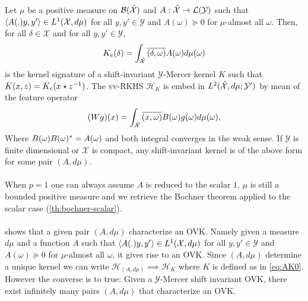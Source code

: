 \begin{proposition}\label{pr:mercer_kernel_bochner}
Let $\mu$ be a positive measure on $\mathcal{B}(\mathcal{\hat{\mathcal{X}}})$ and $A: \hat{\mathcal{X}}\to \mathcal{L}(\mathcal{Y})$ such that $\langle A(.)y,y'\rangle\in L^1(\mathcal{X},d\mu)$ for all $y,y'\in\mathcal{Y}$ and $A(\omega)\succcurlyeq 0$ for $\mu$-almost all $\omega$. Then, for all $\delta \in \mathcal{X}$ and for all $y, y' \in \mathcal{Y}$,
\begin{dmath}
\label{eq:AK0}
K_e(\delta)=\int_{\dual{\mathcal{X}}}\conj{\pairing{\delta,\omega}}A(\omega)d\mu(\omega)
\end{dmath}
is the kernel signature of a shift-invariant $\mathcal{Y}$-Mercer kernel $K$ such that $K(x,z)=K_e(x \star {z}^{-1})$. The \acs{vv-RKHS} $\mathcal{H}_K$ is embed in $L^2(\hat{\mathcal{X}},d\mu;\mathcal{Y}')$ by mean of the feature operator
\begin{dmath}
\label{eq:feature_operator}
(Wg)(x)=\int_{\mathcal{\dual{X}}}\conj{\pairing{x,\omega}}B(\omega)g(\omega)d\mu(\omega),
\end{dmath}
Where $B(\omega)B(\omega)^*=A(\omega)$ and both integral converges in the weak sense. If $\mathcal{Y}$ is finite dimensional or $\mathcal{X}$ is compact, any shift-invariant kernel is of the above form for some pair $(A, d\mu)$. 
\end{proposition}
\paragraph{}
When $p=1$ one can always assume $A$ is reduced to the scalar $1$, $\mu$ is still a bounded positive measure and we retrieve the Bochner theorem applied to the scalar case (\cref{th:bochner-scalar}).
\paragraph{}
 shows that a given pair $(A,d\mu)$ characterize an \acs{OVK}. Namely given a measure $d\mu$ and a function $A$ such that $\langle A(.)y,y'\rangle\in L^1(\mathcal{X},d\mu)$ for all $y,y'\in\mathcal{Y}$ and $A(\omega)\succcurlyeq 0$ for $\mu$-almost all $\omega$, it gives rise to an \acs{OVK}. Since $(A,d\mu)$ determine a unique kernel we can write $\mathcal{H}_{(A,d\mu)}{\scriptstyle\implies}\mathcal{H}_K$ where $K$ is defined as in \cref{eq:AK0}. However the converse is to true: Given a $\mathcal{Y}$-Mercer shift invariant \acl{OVK}, there exist infinitely many pairs $(A,d\mu)$ that characterize an \acs{OVK}.
